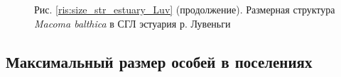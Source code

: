 \documentclass[12pt, a4paper]{article}
\begin{document}
\begin{figure}[h]


\begin{center}
Рис. \ref{ris:size_str_estuary_Luv} (продолжение). Размерная структура {\it Macoma balthica} в СГЛ эстуария р. Лувеньги

\end{center}
\end{figure}





		\subsection{Максимальный размер особей в поселениях}
\end{document}
